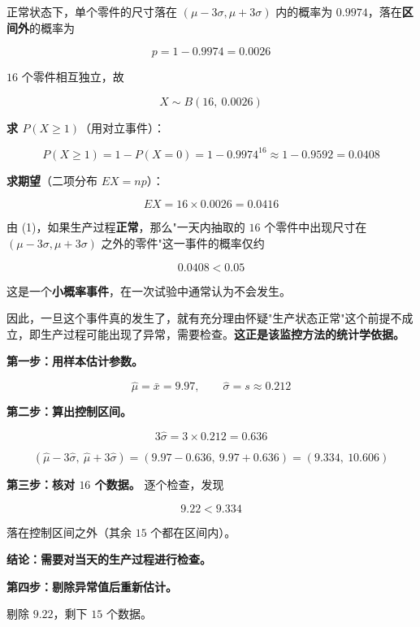 \begin{answer}
正常状态下，单个零件的尺寸落在 $(\mu-3\sigma,\mu+3\sigma)$ 内的概率为 $0.9974$，落在\textbf{区间外}的概率为

\nopagebreak[4]
\[p=1-0.9974=0.0026\]

$16$ 个零件相互独立，故

\nopagebreak[4]
\[X\sim B(16,\ 0.0026)\]

\textbf{求 $P(X\ge1)$}（用对立事件）：

\nopagebreak[4]
\[P(X\ge1)=1-P(X=0)=1-0.9974^{16}\approx1-0.9592=0.0408\]

\textbf{求期望}（二项分布 $EX=np$）：

\nopagebreak[4]
\[EX=16\times0.0026=0.0416\]


由 (1)，如果生产过程\textbf{正常}，那么"一天内抽取的 $16$ 个零件中出现尺寸在 $(\mu-3\sigma,\mu+3\sigma)$ 之外的零件"这一事件的概率仅约

\nopagebreak[4]
\[0.0408<0.05\]

这是一个\textbf{小概率事件}，在一次试验中通常认为不会发生。

因此，一旦这个事件真的发生了，就有充分理由怀疑"生产状态正常"这个前提不成立，即生产过程可能出现了异常，需要检查。\textbf{这正是该监控方法的统计学依据。}


\textbf{第一步：用样本估计参数。}

\nopagebreak[4]
\[\hat\mu=\bar x=9.97,\qquad \hat\sigma=s\approx0.212\]

\textbf{第二步：算出控制区间。}

\nopagebreak[4]
\[3\hat\sigma=3\times0.212=0.636\]

\nopagebreak[4]
\[\left(\hat\mu-3\hat\sigma,\ \hat\mu+3\hat\sigma\right)=(9.97-0.636,\ 9.97+0.636)=(9.334,\ 10.606)\]

\textbf{第三步：核对 $16$ 个数据。} 逐个检查，发现

\nopagebreak[4]
\[9.22<9.334\]

落在控制区间之外（其余 $15$ 个都在区间内）。

\textbf{结论：需要对当天的生产过程进行检查。}

\textbf{第四步：剔除异常值后重新估计。}

剔除 $9.22$，剩下 $15$ 个数据。


\end{answer}
